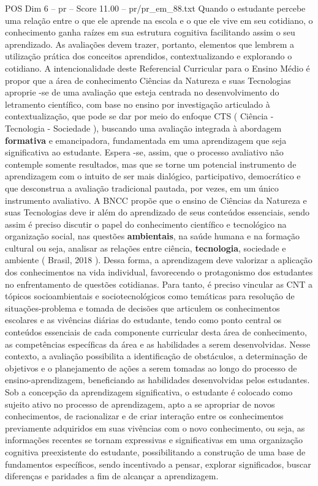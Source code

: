 \begin{textsample}{POS Dim 6 – pr – Score 11.00 – pr/pr\_em\_88.txt}
Quando o estudante percebe uma relação entre o que ele aprende na escola e o que ele vive em seu cotidiano, o conhecimento ganha raízes em sua estrutura cognitiva facilitando assim o seu aprendizado.
As avaliações devem trazer, portanto, elementos que lembrem a utilização prática dos conceitos aprendidos, contextualizando e explorando o cotidiano.
A intencionalidade deste Referencial Curricular para o Ensino Médio é propor que a área de conhecimento Ciências da Natureza e suas Tecnologias aproprie -se de uma avaliação que esteja centrada no desenvolvimento do letramento científico, com base no ensino por investigação articulado à contextualização, que pode se dar por meio do enfoque CTS ( Ciência - Tecnologia - Sociedade ), buscando uma avaliação integrada à abordagem \textbf{formativa} e emancipadora, fundamentada em uma aprendizagem que seja significativa ao estudante.
Espera -se, assim, que o processo avaliativo não contemple somente resultados, mas que se torne um potencial instrumento de aprendizagem com o intuito de ser mais dialógico, participativo, democrático e que desconstrua a avaliação tradicional pautada, por vezes, em um único instrumento avaliativo.
A BNCC propõe que o ensino de Ciências da Natureza e suas Tecnologias deve ir além do aprendizado de seus conteúdos essenciais, sendo assim é preciso discutir o papel do conhecimento científico e tecnológico na organização social, nas questões \textbf{ambientais}, na saúde humana e na formação cultural ou seja, analisar as relações entre ciência, \textbf{tecnologia}, sociedade e ambiente ( Brasil, 2018 ).
Dessa forma, a aprendizagem deve valorizar a aplicação dos conhecimentos na vida individual, favorecendo o protagonismo dos estudantes no enfrentamento de questões cotidianas.
Para tanto, é preciso vincular as CNT a tópicos socioambientais e sociotecnológicos como temáticas para resolução de situações-problema e tomada de decisões que articulem os conhecimentos escolares e as vivências diárias do estudante, tendo como ponto central os conteúdos essenciais de cada componente curricular desta área de conhecimento, as competências específicas da área e as habilidades a serem desenvolvidas.
Nesse contexto, a avaliação possibilita a identificação de obstáculos, a determinação de objetivos e o planejamento de ações a serem tomadas ao longo do processo de ensino-aprendizagem, beneficiando as habilidades desenvolvidas pelos estudantes.
Sob a concepção da aprendizagem significativa, o estudante é colocado como sujeito ativo no processo de aprendizagem, apto a se apropriar de novos conhecimentos, de racionalizar e de criar interação entre os conhecimentos previamente adquiridos em suas vivências com o novo conhecimento, ou seja, as informações recentes se tornam expressivas e significativas em uma organização cognitiva preexistente do estudante, possibilitando a construção de uma base de fundamentos específicos, sendo incentivado a pensar, explorar significados, buscar diferenças e paridades a fim de alcançar a aprendizagem.

\end{textsample}
